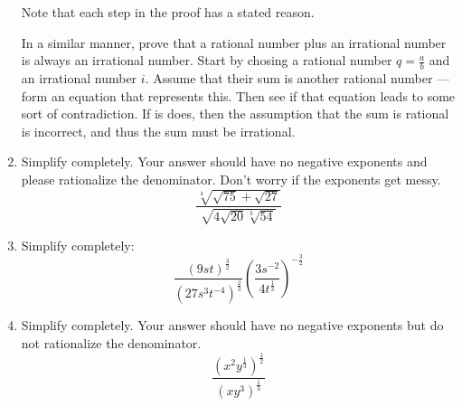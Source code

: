 \documentclass[letterpaper,12pt,fleqn]{article}
\begin{document}
\begin{enumerate}
Note that each step in the proof has a stated reason.

In a similar manner, prove that a rational number plus an irrational
number is always an irrational number. Start by chosing a rational number
$q=\frac{a}{b}$ and an irrational number $i$. Assume that their sum is another
rational number --- form an equation that represents this. Then see if that
equation leads to some sort of contradiction. If is does, then the assumption
that the sum is rational is incorrect, and thus the sum must be irrational.

\item Simplify completely. Your answer should have no negative exponents and
please rationalize the denominator. Don't worry if the exponents get messy.
\[\frac{\sqrt[4]{\sqrt{75}+\sqrt{27}}}{\sqrt{4\sqrt{20}\sqrt[3]{54}}}\]

\item Simplify completely:
\[\frac{(9st)^{\frac{3}{2}}}{(27s^3t^{-4})^{\frac{2}{3}}}
    \left(\frac{3s^{-2}}{4t^{\frac{1}{3}}}\right)^{-\frac{3}{2}}\]

\item Simplify completely. Your answer should have no negative exponents but
do not rationalize the denominator.
\[\frac{(x^2y^{\frac{1}{3}})^{\frac{1}{2}}}{(xy^3)^{\frac{1}{3}}}\]
\end{enumerate}
\end{document}
